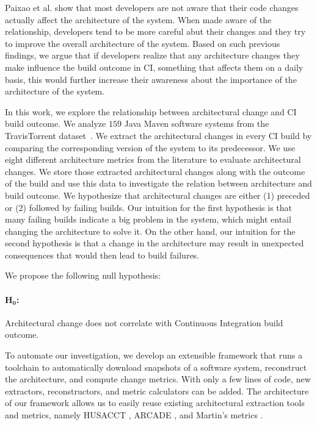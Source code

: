 \documentclass[sigplan, anonymous, review]{acmart}
\begin{document}
Paixao et al. \cite{ImpactAwareness} show that most developers are not aware that their code changes actually affect the architecture of the system. When made aware of the relationship, developers tend to be more careful abut their changes and they try to improve the overall architecture of the system.
Based on such previous findings, we argue that if developers realize that any architecture changes they make influence the build outcome in CI, something that affects them on a daily basis, this would further increase their awareness about the importance of the architecture of the system.

In this work, we explore the relationship between architectural change and CI build outcome.
We analyze $159$ Java Maven software systems from the TravisTorrent dataset~\cite{TravisTorrent}. 
We extract the architectural changes in every CI build by comparing the corresponding version of the system to its predecessor.
We use eight different architecture metrics from the literature to evaluate architectural changes.  
We store those extracted architectural changes along with the outcome of the build and use this data to investigate the relation between architecture and build outcome.
We hypothesize that architectural changes are either (1) preceded or (2) followed by failing builds. 
Our intuition for the first hypothesis is that many failing builds indicate a big problem in the system, which might entail changing the architecture to solve it. 
On the other hand, our intuition for the second hypothesis is that a change in the architecture may result in unexpected consequences that would then lead to build failures.

We propose the following null hypothesis:

\paragraph{$\mathbf{H_0}$:} Architectural change does not correlate with Continuous Integration build outcome. 
\vspace{0.2cm}

To automate our investigation, we develop an extensible framework that runs a toolchain to automatically download snapshots of a software system, reconstruct the architecture, and compute change metrics. With only a few lines of code, new extractors, reconstructors, and metric calculators can be added. 
The architecture of our framework allows us to easily reuse existing architectural extraction tools and metrics, namely HUSACCT \cite{Husacct1}, ARCADE \cite{Arcade}, and Martin's metrics \cite{martinsMetrics}.
\end{document}
